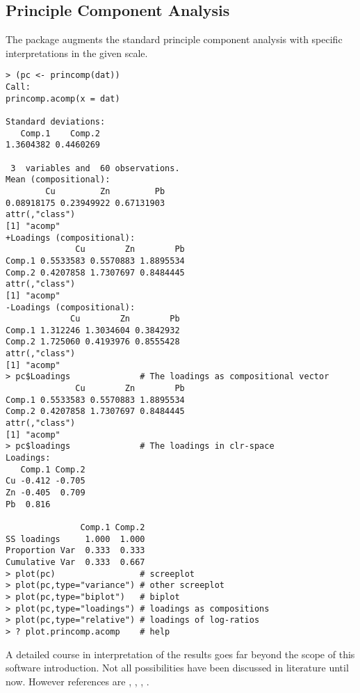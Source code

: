 \documentclass{article}
\begin{document}
\subsection{Principle Component Analysis}
The package augments the standard principle component analysis with specific
interpretations in the given scale. 
\begin{verbatim}
> (pc <- princomp(dat))
Call:
princomp.acomp(x = dat)

Standard deviations:
   Comp.1    Comp.2 
1.3604382 0.4460269 

 3  variables and  60 observations.
Mean (compositional):
        Cu         Zn         Pb 
0.08918175 0.23949922 0.67131903 
attr(,"class")
[1] "acomp"
+Loadings (compositional):
              Cu        Zn        Pb
Comp.1 0.5533583 0.5570883 1.8895534
Comp.2 0.4207858 1.7307697 0.8484445
attr(,"class")
[1] "acomp"
-Loadings (compositional):
             Cu        Zn        Pb
Comp.1 1.312246 1.3034604 0.3842932
Comp.2 1.725060 0.4193976 0.8555428
attr(,"class")
[1] "acomp"
> pc$Loadings              # The loadings as compositional vector
              Cu        Zn        Pb
Comp.1 0.5533583 0.5570883 1.8895534
Comp.2 0.4207858 1.7307697 0.8484445
attr(,"class")
[1] "acomp"
> pc$loadings              # The loadings in clr-space
Loadings:
   Comp.1 Comp.2
Cu -0.412 -0.705
Zn -0.405  0.709
Pb  0.816       

               Comp.1 Comp.2
SS loadings     1.000  1.000
Proportion Var  0.333  0.333
Cumulative Var  0.333  0.667
> plot(pc)                 # screeplot
> plot(pc,type="variance") # other screeplot
> plot(pc,type="biplot")   # biplot
> plot(pc,type="loadings") # loadings as compositions 
> plot(pc,type="relative") # loadings of log-ratios 
> ? plot.princomp.acomp    # help 
\end{verbatim}
A detailed course in interpretation of the results goes far beyond the scope
of this software introduction. Not all possibilities have been discussed in
literature until now. However references are \cite{AG02}, \cite{PE01},
\cite{Paw03}, \cite{PM05}.
\end{document}
